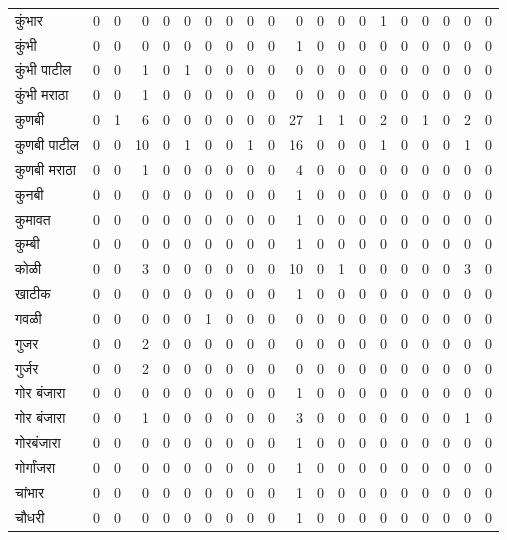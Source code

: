 \documentclass{article}
\begin{document}
\begin{table}
\begin{tabular}{lrrrrrrrrrrrrrrrrrrr}
कुंभार & 0 & 0 & 0 & 0 & 0 & 0 & 0 & 0 & 0 & 0 & 0 & 0 & 0 & 1 & 0 & 0 & 0 & 0 & 0 \\
कुंभी & 0 & 0 & 0 & 0 & 0 & 0 & 0 & 0 & 0 & 1 & 0 & 0 & 0 & 0 & 0 & 0 & 0 & 0 & 0 \\
कुंभी पाटील & 0 & 0 & 1 & 0 & 1 & 0 & 0 & 0 & 0 & 0 & 0 & 0 & 0 & 0 & 0 & 0 & 0 & 0 & 0 \\
कुंभी मराठा & 0 & 0 & 1 & 0 & 0 & 0 & 0 & 0 & 0 & 0 & 0 & 0 & 0 & 0 & 0 & 0 & 0 & 0 & 0 \\
कुणबी & 0 & 1 & 6 & 0 & 0 & 0 & 0 & 0 & 0 & 27 & 1 & 1 & 0 & 2 & 0 & 1 & 0 & 2 & 0 \\
कुणबी पाटील & 0 & 0 & 10 & 0 & 1 & 0 & 0 & 1 & 0 & 16 & 0 & 0 & 0 & 1 & 0 & 0 & 0 & 1 & 0 \\
कुणबी मराठा & 0 & 0 & 1 & 0 & 0 & 0 & 0 & 0 & 0 & 4 & 0 & 0 & 0 & 0 & 0 & 0 & 0 & 0 & 0 \\
कुनबी & 0 & 0 & 0 & 0 & 0 & 0 & 0 & 0 & 0 & 1 & 0 & 0 & 0 & 0 & 0 & 0 & 0 & 0 & 0 \\
कुमावत & 0 & 0 & 0 & 0 & 0 & 0 & 0 & 0 & 0 & 1 & 0 & 0 & 0 & 0 & 0 & 0 & 0 & 0 & 0 \\
कुम्बी & 0 & 0 & 0 & 0 & 0 & 0 & 0 & 0 & 0 & 1 & 0 & 0 & 0 & 0 & 0 & 0 & 0 & 0 & 0 \\
कोळी & 0 & 0 & 3 & 0 & 0 & 0 & 0 & 0 & 0 & 10 & 0 & 1 & 0 & 0 & 0 & 0 & 0 & 3 & 0 \\
खाटीक & 0 & 0 & 0 & 0 & 0 & 0 & 0 & 0 & 0 & 1 & 0 & 0 & 0 & 0 & 0 & 0 & 0 & 0 & 0 \\
गवळी & 0 & 0 & 0 & 0 & 0 & 1 & 0 & 0 & 0 & 0 & 0 & 0 & 0 & 0 & 0 & 0 & 0 & 0 & 0 \\
गुजर & 0 & 0 & 2 & 0 & 0 & 0 & 0 & 0 & 0 & 0 & 0 & 0 & 0 & 0 & 0 & 0 & 0 & 0 & 0 \\
गुर्जर & 0 & 0 & 2 & 0 & 0 & 0 & 0 & 0 & 0 & 0 & 0 & 0 & 0 & 0 & 0 & 0 & 0 & 0 & 0 \\
गोर  बंजारा & 0 & 0 & 0 & 0 & 0 & 0 & 0 & 0 & 0 & 1 & 0 & 0 & 0 & 0 & 0 & 0 & 0 & 0 & 0 \\
गोर बंजारा & 0 & 0 & 1 & 0 & 0 & 0 & 0 & 0 & 0 & 3 & 0 & 0 & 0 & 0 & 0 & 0 & 0 & 1 & 0 \\
गोरबंजारा & 0 & 0 & 0 & 0 & 0 & 0 & 0 & 0 & 0 & 1 & 0 & 0 & 0 & 0 & 0 & 0 & 0 & 0 & 0 \\
गोर्गांजरा & 0 & 0 & 0 & 0 & 0 & 0 & 0 & 0 & 0 & 1 & 0 & 0 & 0 & 0 & 0 & 0 & 0 & 0 & 0 \\
चांभार & 0 & 0 & 0 & 0 & 0 & 0 & 0 & 0 & 0 & 1 & 0 & 0 & 0 & 0 & 0 & 0 & 0 & 0 & 0 \\
चौधरी & 0 & 0 & 0 & 0 & 0 & 0 & 0 & 0 & 0 & 1 & 0 & 0 & 0 & 0 & 0 & 0 & 0 & 0 & 0 \\

\end{tabular}
\end{table}
\end{document}
